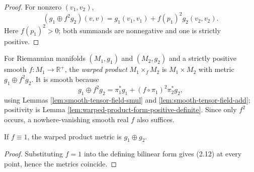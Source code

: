 \begin{proof}

\sketch For nonzero $(v_1,v_2)$,
\[
(g_1\oplus f^2g_2)(v,v)=g_1(v_1,v_1)+f(p_1)^2g_2(v_2,v_2).
\]
Here $f(p_1)^2>0$; both summands are nonnegative and one is strictly positive.
\end{proof}

\begin{definition}
\label{def:warped-product}





For Riemannian manifolds $(M_1,g_1)$ and $(M_2,g_2)$ and a strictly positive smooth $f:M_1\to\mathbb R^+$, the \emph{warped product} $M_1\times_fM_2$ is $M_1\times M_2$ with metric $g_1\oplus f^2g_2$. It is smooth because
\[
g_1\oplus f^2g_2=\pi_1^*g_1+(f\circ\pi_1)^2\pi_2^*g_2,
\]
using Lemmas \ref{lem:smooth-tensor-field-smul} and \ref{lem:smooth-tensor-field-add}; positivity is Lemma \ref{lem:warped-product-form-positive-definite}. Since only $f^2$ occurs, a nowhere-vanishing smooth real $f$ also suffices.
\end{definition}

\begin{proposition}
\label{prop:warped-product-constant-one}





If $f\equiv1$, the warped product metric is $g_1\oplus g_2$.
\end{proposition}

\begin{proof}

\sketch Substituting $f=1$ into the defining bilinear form gives (2.12) at every point, hence the metrics coincide.
\end{proof}

